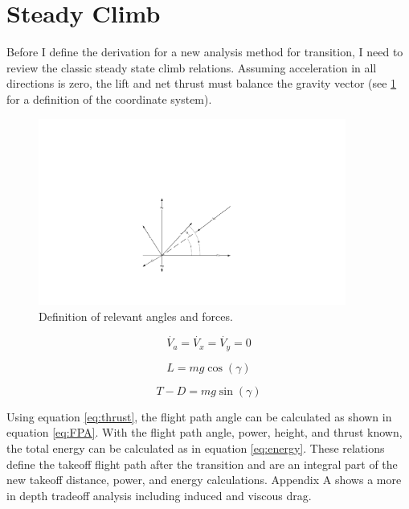 \documentclass[10pt,english]{article}
\begin{document}
\section{Steady Climb}
\label{s:steady_climb}

Before I define the derivation for a new analysis method for transition, I need to review the classic steady state climb relations.  Assuming acceleration in all directions is zero, the lift and net thrust must balance the gravity vector (see \cref{f:angles} for a definition of the coordinate system).

\begin{figure}[H]
\centering
\includegraphics[trim={10cm 3.5cm 10cm 9cm},clip,width=0.9\textwidth]{Aircraft_Angles}
\vspace{-5pt}
\caption{Definition of relevant angles and forces.}
\label{f:angles}
\end{figure}




\begin{equation}
\label{eq:acceleration}
\dot{V_a} =\dot{V_x} = \dot{V_y} = 0
\end{equation}

\begin{equation}
\label{eq:lift}
L = m g  \cos(\gamma)
\end{equation}

\begin{equation}
\label{eq:thrust}
T-D = m g  \sin(\gamma)
\end{equation}

\vspace{10pt}

Using equation \ref{eq:thrust}, the flight path angle can be calculated as shown in equation \ref{eq:FPA}.  With the flight path angle, power, height, and thrust known, the total energy can be calculated as in equation \ref{eq:energy}.  These relations define the takeoff flight path after the transition and are an integral part of the new takeoff distance, power, and energy calculations.  Appendix A shows a more in depth tradeoff analysis including induced and viscous drag.
\end{document}

